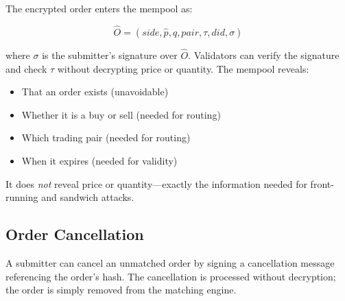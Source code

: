 The encrypted order enters the mempool as:

\begin{equation}
\hat{O} = (\textit{side}, \hat{p}, \hat{q}, \textit{pair}, \tau, \textit{did}, \sigma)
\end{equation}

where $\sigma$ is the submitter's signature over $\hat{O}$. Validators can verify the signature and check $\tau$ without decrypting price or quantity. The mempool reveals:

\begin{itemize}
    \item That an order exists (unavoidable)
    \item Whether it is a buy or sell (needed for routing)
    \item Which trading pair (needed for routing)
    \item When it expires (needed for validity)
\end{itemize}

It does \emph{not} reveal price or quantity---exactly the information needed for front-running and sandwich attacks.

\subsection{Order Cancellation}

A submitter can cancel an unmatched order by signing a cancellation message referencing the order's hash. The cancellation is processed without decryption; the order is simply removed from the matching engine.

